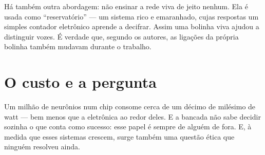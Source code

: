 Há também outra abordagem: não ensinar a rede viva de jeito nenhum. Ela é usada como ``reservatório'' --- um sistema rico e emaranhado, cujas respostas um simples contador eletrônico aprende a decifrar. Assim uma bolinha viva ajudou a distinguir vozes. É verdade que, segundo os autores, as ligações da própria bolinha também mudavam durante o trabalho.

\section*{O custo e a pergunta}

Um milhão de neurônios num chip consome cerca de um décimo de milésimo de watt --- bem menos que a eletrônica ao redor deles. E a bancada não sabe decidir sozinha o que conta como sucesso: esse papel é sempre de alguém de fora. E, à medida que esses sistemas crescem, surge também uma questão ética que ninguém resolveu ainda.

